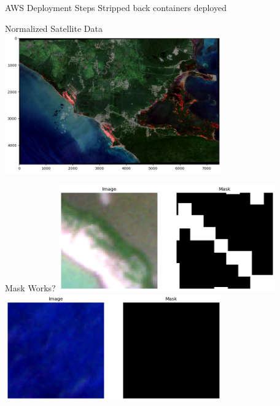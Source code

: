 \begin{frame}{AWS Deployment Steps}
    Stripped back containers deployed
\end{frame}

\begin{frame}{Normalized Satellite Data}
     \centering
     \includegraphics[height=0.7\textheight,width=0.7\textwidth,keepaspectratio]{images/MM3.png}
\end{frame}

\begin{frame}{Mask Works?}
     \centering
     \includegraphics[height=0.7\textheight,width=0.7\textwidth,keepaspectratio]{images/MM1.png}
     \includegraphics[height=0.7\textheight,width=0.7\textwidth,keepaspectratio]{images/MM2.png}
\end{frame}
